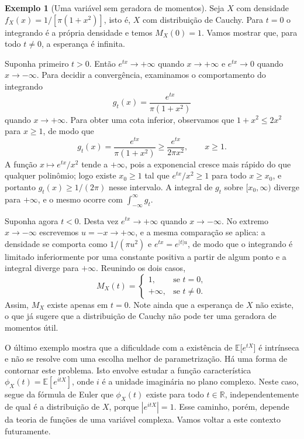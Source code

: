 \documentclass[12pt,portuguese]{article}
\theoremstyle{definition}
\newtheorem{example}[example]{Exemplo}
\theoremstyle{plainexercise}
\theoremstyle{starredexercise}
\theoremstyle{definition}
\begin{document}
\begin{example}[Uma variável sem geradora de momentos]\label{ex:fgm-cauchy}
Seja $X$ com densidade $f_X(x)=1/[\pi(1+x^2)]$, isto é, $X$ com distribuição de
Cauchy. Para $t=0$ o integrando é a própria densidade e temos
$M_X(0)=1$. Vamos mostrar que, para todo $t\neq0$, a esperança é infinita.

Suponha primeiro $t>0$. Então $e^{tx}\to+\infty$ quando $x\to+\infty$ e
$e^{tx}\to0$ quando $x\to-\infty$. Para decidir a convergência, examinamos o
comportamento do integrando
\[
g_t(x) = \frac{e^{tx}}{\pi(1+x^2)}
\]
quando $x\to+\infty$. Para obter uma cota inferior, observamos que
$1+x^2\leqslant 2x^2$ para $x\geqslant 1$, de modo que
\[
g_t(x)=\frac{e^{tx}}{\pi(1+x^2)}
\geqslant \frac{e^{tx}}{2\pi x^2},\qquad x\geqslant 1 .
\]
A função $x\mapsto e^{tx}/x^2$ tende a $+\infty$, pois a exponencial cresce
mais rápido do que qualquer polinômio; logo existe $x_0\geqslant 1$ tal que
$e^{tx}/x^2\geqslant 1$ para todo $x\geqslant x_0$, e portanto
$g_t(x)\geqslant 1/(2\pi)$ nesse intervalo. A integral de $g_t$ sobre
$[x_0,\infty)$ diverge para $+\infty$, e o mesmo ocorre com
$\int_{-\infty}^{\infty} g_t$.

Suponha agora $t<0$. Desta vez $e^{tx}\to+\infty$ quando $x\to-\infty$. No
extremo $x\to-\infty$ escrevemos $u=-x\to+\infty$, e a mesma comparação se
aplica: a densidade se comporta como $1/(\pi u^2)$ e $e^{tx}=e^{|t|u}$, de modo
que o integrando é limitado inferiormente por uma constante positiva a partir de
algum ponto e a integral diverge para $+\infty$. Reunindo os dois casos,
\[
M_X(t) = \begin{cases}
1, & \text{se } t=0, \\[0.2cm]
+\infty, & \text{se } t\neq0.
\end{cases}
\]
Assim, $M_X$ existe apenas em $t=0$. Note ainda que a esperança de $X$ não
existe, o que já sugere que a distribuição de Cauchy não pode ter uma geradora
de momentos útil.
\end{example}

\medskip

O último exemplo mostra que a dificuldade com a existência de
$\mathbb{E}\bigl[e^{tX}\bigr]$ é intrínseca e não se resolve com uma escolha
melhor de parametrização. Há uma forma de contornar este problema. Isto envolve estudar a função
característica $\phi_X(t)=\mathbb{E}[e^{itX}]$, onde $i$ é a unidade imaginária no plano complexo. 
Neste caso, segue da fórmula de Euler que $\phi_X(t)$ existe para todo $t\in\mathbb{R}$,
independentemente de qual é a distribuição de $X$, porque $|e^{itX}|=1$. 
Esse caminho, porém, depende da teoria de funções de uma variável complexa.
Vamos voltar a este contexto futuramente. 
\end{document}
